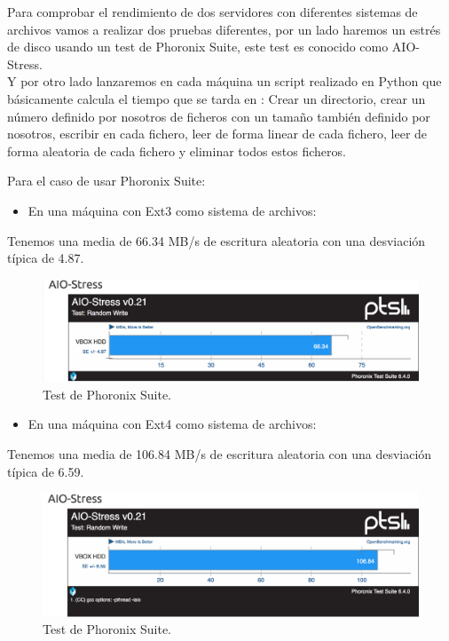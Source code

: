 Para comprobar el rendimiento de dos servidores con diferentes sistemas de archivos vamos a realizar dos pruebas diferentes, por un lado haremos un estrés de disco usando un test de Phoronix Suite, este test es conocido como AIO-Stress. \cite{AIOSTRESS}
\\
Y por otro lado lanzaremos en cada máquina un script realizado en Python que básicamente calcula el tiempo que se tarda en : Crear un directorio, crear un número definido por nosotros de ficheros con un tamaño también definido por nosotros, escribir en cada fichero, leer de forma linear de cada fichero, leer de forma aleatoria de cada fichero y eliminar todos estos ficheros.

\newpage
Para el caso de usar Phoronix Suite:

\begin{itemize}
	\item En una máquina con Ext3 como sistema de archivos:
\end{itemize}

Tenemos una media de 66.34 MB/s de escritura aleatoria con una desviación típica de 4.87. \cite{BENCHMARKPHORONIXEXT3}
\begin{figure}[H]
	\begin{center}
		\includegraphics[width=15cm]{Imagenes/Estres_ext3}
		\caption{Test de Phoronix Suite.}
		\label{fig:26}
	\end{center}
\end{figure}

\begin{itemize}
	\item En una máquina con Ext4 como sistema de archivos:
\end{itemize}

Tenemos una media de 106.84 MB/s de escritura aleatoria con una desviación típica de 6.59. \cite{BENCHMARKPHORONIXEXT4}
\begin{figure}[H]
	\begin{center}
		\includegraphics[width=15cm]{Imagenes/Estres_ext4}
		\caption{Test de Phoronix Suite.}
		\label{fig:27}
	\end{center}
\end{figure}

